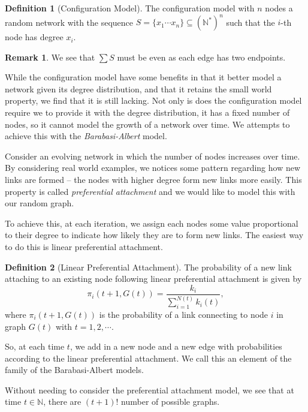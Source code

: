 \documentclass[
]{article}
\theoremstyle{definition}
\newtheorem*{remark}{Remark}
\theoremstyle{definition}
\newtheorem{definition}{Definition}[section]
\begin{document}
\begin{definition}[Configuration Model]
  The configuration model with \(n\) nodes a random network with the
  sequence \(S = \{x_1 \cdots x_n\} \subseteq (\mathbb{N}^*)^n\) such that the 
  \(i\)-th node has degree \(x_i\).
\end{definition}

\begin{remark}
  We see that \(\sum S\) must be even as each edge has two endpoints.
\end{remark}

While the configuration model have some benefits in that it better model
a network given its degree distribution, and that it retains the small
world property, we find that it is still lacking. Not only is does the
configuration model require we to provide it with the degree
distribution, it has a fixed number of nodes, so it cannot model the
growth of a network over time. We attempts to achieve this with the
\emph{Barabasi-Albert} model.

Consider an evolving network in which the number of nodes increases over
time. By considering real world examples, we notices some pattern
regarding how new links are formed -- the nodes with higher degree form
new links more easily. This property is called \emph{preferential
attachment} and we would like to model this with our random graph.

To achieve this, at each iteration, we assign each nodes some value
proportional to their degree to indicate how likely they are to form new
links. The easiest way to do this is linear preferential attachment.

\begin{definition}[Linear Preferential Attachment]
  The probability of a new link attaching to an existing node following 
  linear preferential attachment is given by 
  \[\pi_i (t + 1, G(t)) = \frac{k_i}{\sum_{i = 1}^{N(t)}k_i(t)},\]
  where \(\pi_i(t + 1, G(t))\) is the probability of a link connecting to node 
  \(i\) in graph \(G(t)\) with \(t = 1, 2, \cdots\).
\end{definition}

So, at each time \(t\), we add in a new node and a new edge with
probabilities according to the linear preferential attachment. We call
this an element of the family of the Barabasi-Albert models.

Without needing to consider the preferential attachment model, we see
that at time \(t \in \mathbb{N}\), there are \((t + 1)!\) number of
possible graphs.
\end{document}
